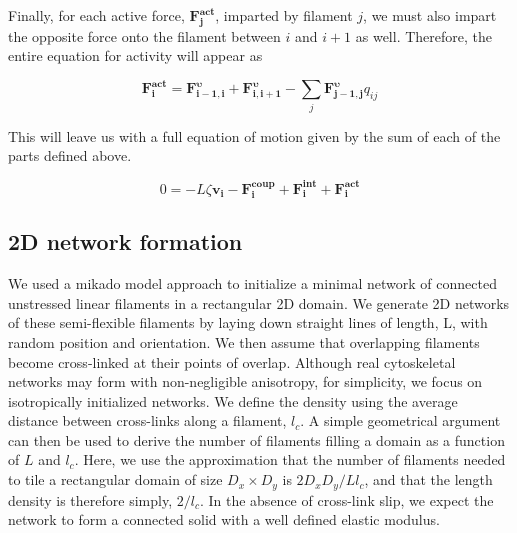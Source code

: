 \documentclass[10pt,letterpaper]{article}
\begin{document}
Finally, for each active force, $\mathbf{F^{act}_j}$, imparted by filament $j$, we must also impart the opposite force onto the filament between $i$ and $i+1$ as well.  Therefore, the entire equation for activity will appear as

\begin{equation}
\label{eqn:active}
\mathbf{F^{act}_{i}}=\mathbf{F^{\upsilon}_{i-1,i}} + \mathbf{F^{\upsilon}_{i,i+1}}
- \sum_{j}\mathbf{F^{\upsilon}_{j-1,j}}q_{ij}
\end{equation}


This will leave us with a full equation of motion given by the sum of each of the parts defined above.

\begin{equation}
\label{eqn:syst3}
0=-L\zeta\mathbf{ v_i} -\mathbf{F^{coup}_i}+ \mathbf{F^{int}_i}+\mathbf{F^{act}_i} 
\end{equation}

\subsection*{2D network formation}

We used a mikado model approach \cite{Unterberger2014} to initialize a minimal network of connected unstressed linear filaments in a rectangular 2D domain. We generate 2D networks of these semi-flexible filaments by laying down straight lines of length, L, with random position and orientation. We then assume that overlapping filaments become cross-linked at their points of overlap. Although real cytoskeletal networks may form with non-negligible anisotropy, for simplicity, we focus on isotropically initialized networks. We define the density using the average distance between cross-links along a filament, $l_c$. A simple geometrical argument can then be used to derive the number of filaments filling a domain as a function of $L$ and $l_c$\cite{theo_hlm}.  Here, we use the approximation that the number of filaments needed to tile a rectangular domain of size $D_x \times D_y$  is $2D_xD_y/Ll_c$, and that the length density is therefore simply, $2/l_c$. In the absence of cross-link slip, we expect the network to form a connected solid with a well defined elastic modulus\cite{theo_hlm,theo_hlm2}.
\end{document}
